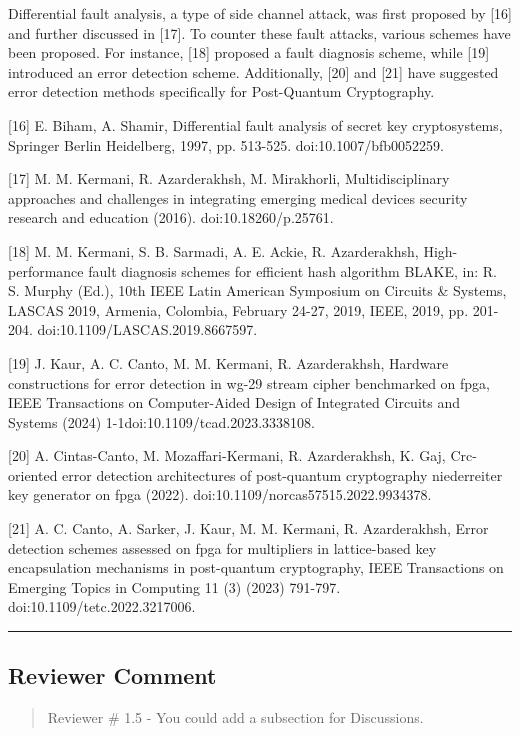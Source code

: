 \color{blue}

Differential fault analysis, a type of side channel attack, was first proposed by [16] and further discussed in [17]. To counter these fault attacks, various schemes have been proposed. For instance, [18] proposed a fault diagnosis scheme, while [19] introduced an error detection scheme. Additionally, [20] and [21] have suggested error detection methods specifically for Post-Quantum Cryptography.

	[16] E. Biham, A. Shamir, Differential fault analysis of secret key cryptosystems, Springer Berlin Heidelberg, 1997, pp. 513-525. doi:10.1007/bfb0052259.


[17] M. M. Kermani, R. Azarderakhsh, M. Mirakhorli, Multidisciplinary approaches and challenges in integrating emerging medical devices security research and education (2016). \linebreak doi:10.18260/p.25761.


[18] M. M. Kermani, S. B. Sarmadi, A. E. Ackie, R. Azarderakhsh, High-performance fault diagnosis schemes for efficient hash algorithm BLAKE, in: R. S. Murphy (Ed.), 10th IEEE Latin American Symposium on Circuits \& Systems, LASCAS 2019, Armenia, Colombia, February 24-27, 2019, IEEE, 2019, pp. 201-204. doi:10.1109/LASCAS.2019.8667597.

[19] J. Kaur, A. C. Canto, M. M. Kermani, R. Azarderakhsh, Hardware constructions for error detection in wg-29 stream cipher benchmarked on fpga, IEEE Transactions on Computer-Aided Design of Integrated Circuits and Systems (2024) 1-1doi:10.1109/tcad.2023.3338108.

[20] A. Cintas-Canto, M. Mozaffari-Kermani, R. Azarderakhsh, K. Gaj, Crc-oriented error detection architectures of post-quantum cryptography niederreiter key generator on fpga (2022). doi:10.1109/norcas57515.2022.9934378.

[21] A. C. Canto, A. Sarker, J. Kaur, M. M. Kermani, R. Azarderakhsh, Error detection schemes assessed on fpga for multipliers in lattice-based key encapsulation mechanisms in post-quantum cryptography, IEEE Transactions on Emerging Topics in Computing 11 (3) (2023) 791-797. doi:10.1109/tetc.2022.3217006.


\color{black}

\noindent\rule{\linewidth}{2.0pt}

\subsection{Reviewer Comment}
\begin{mdframed}
	\begin{quote}
		Reviewer \# 1.5 - You could add a subsection for Discussions.
	\end{quote}
\end{mdframed}


